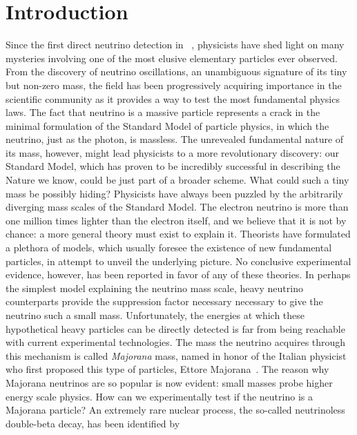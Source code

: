 
\chapter*{Introduction}%
\label{chap:introduction}

Since the first direct neutrino detection in ~\cite{Cowan1956}, physicists have
shed light on many mysteries involving one of the most elusive elementary particles ever
observed. From the discovery of neutrino oscillations, an unambiguous signature of its
tiny but non-zero mass, the field has been progressively acquiring importance in the
scientific community as it provides a way to test the most fundamental physics laws. The
fact that neutrino is a massive particle represents a crack in the minimal formulation of
the Standard Model of particle physics, in which the neutrino, just as the photon, is
massless.  The unrevealed fundamental nature of its mass, however, might lead physicists
to a more revolutionary discovery: our Standard Model, which has proven to be incredibly
successful in describing the Nature we know, could be just part of a broader scheme.
\newpar
What could such a tiny mass be possibly hiding? Physicists have always been puzzled by the
arbitrarily diverging mass scales of the Standard Model. The electron neutrino is more
than one million times lighter than the electron itself, and we believe that it is not by
chance: a more general theory must exist to explain it. Theorists have formulated a
plethora of models, which usually foresee the existence of new fundamental particles, in
attempt to unveil the underlying picture. No conclusive experimental evidence, however,
has been reported in favor of any of these theories. In perhaps the simplest model
explaining the neutrino mass scale, heavy neutrino counterparts provide the suppression
factor necessary necessary to give the neutrino such a small mass. Unfortunately, the
energies at which these hypothetical heavy particles can be directly detected is far from
being reachable with current experimental technologies. The mass the neutrino acquires
through this mechanism is called \emph{Majorana} mass, named in honor of the Italian
physicist who first proposed this type of particles, Ettore Majorana~\cite{Majorana1932}.
The reason why Majorana neutrinos are so popular is now evident: small masses probe higher
energy scale physics.
\newpar
How can we experimentally test if the neutrino is a Majorana particle? An extremely rare
nuclear process, the so-called neutrinoless double-beta decay, has been identified by
